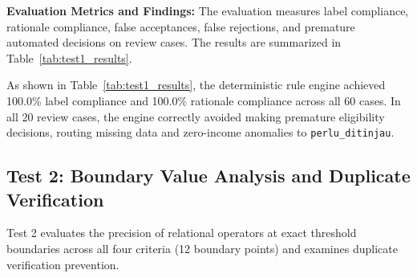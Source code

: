 \documentclass[runningheads]{llncs}
\begin{document}
\noindent\textbf{Evaluation Metrics and Findings:} The evaluation measures label compliance, rationale compliance, false acceptances, false rejections, and premature automated decisions on review cases. The results are summarized in Table~\ref{tab:test1_results}.

\begin{table}[htbp]
\caption{Test 1 rule compliance evaluation results ($N=60$)}
\label{tab:test1_results}
\centering
{}
\end{table}

As shown in Table~\ref{tab:test1_results}, the deterministic rule engine achieved 100.0\% label compliance and 100.0\% rationale compliance across all 60 cases. In all 20 review cases, the engine correctly avoided making premature eligibility decisions, routing missing data and zero-income anomalies to \texttt{perlu\_ditinjau}.

\subsection{Test 2: Boundary Value Analysis and Duplicate Verification}

Test 2 evaluates the precision of relational operators at exact threshold boundaries across all four criteria (12 boundary points) and examines duplicate verification prevention.
\end{document}
